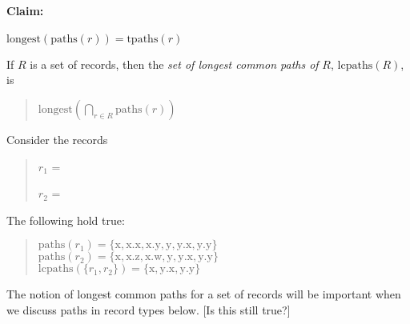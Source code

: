 \paragraph{Claim:}
$\mathrm{longest}(\mathrm{paths}(r))=\mathrm{tpaths}(r)$

If $R$ is a set of records, then the \textit{set of longest common
  paths of} $R$, $\mathrm{lcpaths}(R)$, is
\begin{quote}
$\mathrm{longest}(\displaystyle{\bigcap_{r\in R}}\mathrm{paths}(r))$
\end{quote} 

Consider the records
\begin{quote}
$r_1$ = 

$r_2$ = 
\end{quote}
The following hold true:
\begin{quote}
$\mathrm{paths}(r_1) = \{\mathrm{x},\mathrm{x.x},\mathrm{x.y},\mathrm{y},\mathrm{y.x},\mathrm{y.y}\}$\\
$\mathrm{paths}(r_2) = \{\mathrm{x},\mathrm{x.z},\mathrm{x.w},\mathrm{y},\mathrm{y.x},\mathrm{y.y}\}$\\
$\mathrm{lcpaths}(\{r_1,r_2\}) = \{\mathrm{x},\mathrm{y.x},\mathrm{y.y}\}$
\end{quote} 
The notion of longest common paths for a set of records will be
important when we discuss paths in record types below.  [Is this still true?] 
  

